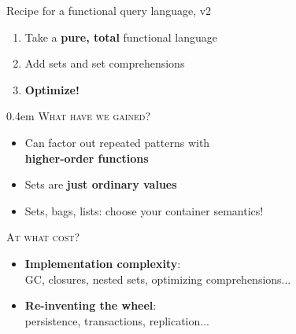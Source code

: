\documentclass[xcolor=table,usenames,dvipsnames,svgnames]{beamer}
\begin{document}

\begin{frame}{Recipe for a functional query language, v2}\Large
  \begin{enumerate}\itemsep 1.5em
  \item Take a \textbf{pure, total} functional language
  \item Add sets and set comprehensions
  \item {\bf Optimize!}
  \end{enumerate}
\end{frame}


\begin{frame}{}\large\parskip 0.4em
  \textsc{What have we gained?}
  \begin{itemize}\itemsep 0.5em
  \item Can factor out repeated patterns with\\ \textbf{higher-order functions}
  \item Sets are \textbf{just ordinary values}
  \item Sets, bags, lists: choose your container semantics!
  \end{itemize}

  \vspace{1em}\pause

  \textsc{At what cost?}
  \begin{itemize}
  \item \textbf{Implementation complexity}:\\
    {\small GC, closures, nested sets, optimizing comprehensions...}
  \item \textbf{Re-inventing the wheel}:\\
    {\small persistence, transactions, replication...}
  \end{itemize}

\end{frame}

\end{document}

